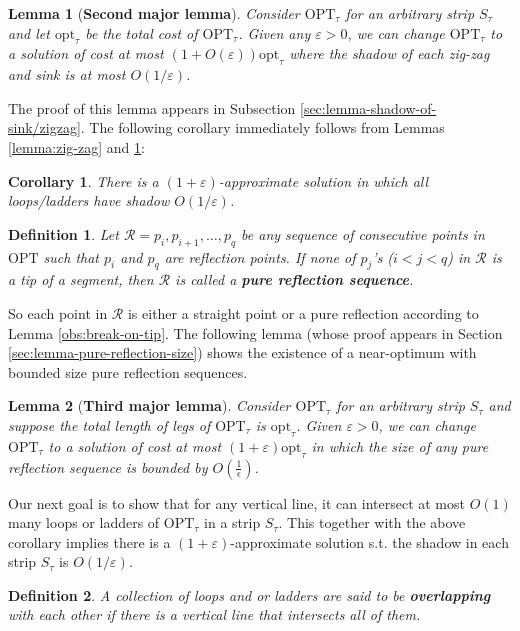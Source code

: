 \documentclass[pdflatex,sn-mathphys-num]{sn-jnl}
\theoremstyle{thmstyleone}
\newtheorem{lemma}{Lemma}
\newtheorem{corollary}{Corollary}
\newtheorem{definition}{Definition} %
\newcommand{\eps}{\varepsilon}
\newcommand{\opt}{{\text{opt}}}
\newcommand{\OPT}{{\text{OPT}}}
\begin{document}
\begin{lemma}[\bf Second major lemma]\label{lem:strip-bounded-shadow}
    Consider $\OPT_\tau$ for an arbitrary strip $S_\tau$ and
    let $\opt_\tau$ be the total cost of $\OPT_\tau$. Given any 
    $\eps>0$, we can change $\OPT_\tau$ to a solution of cost at most $(1+O(\eps))\opt_\tau$ where the shadow of each zig-zag and sink is at most $O(1/\eps)$.
\end{lemma}

The proof of this lemma appears in Subsection \ref{sec:lemma-shadow-of-sink/zigzag}. The following corollary immediately follows from Lemmas \ref{lemma:zig-zag} and \ref{lem:strip-bounded-shadow}:
\begin{corollary}\label{cor:loop-bounded-shadow}
    There is a $(1+\eps)$-approximate solution in which all loops/ladders have shadow $O(1/\eps)$.
\end{corollary}

\begin{definition}\label{def:pure-reflections}
    Let $\mathcal R = p_i, p_{i+1},\ldots, p_q$ be any sequence of consecutive points in $\OPT$ such that $p_i$ and $p_{q}$ are reflection points. If none of $p_j$'s ($i<j<q$) in $\mathcal R$ is a tip of a segment, then $\mathcal R$ is called a \textbf{pure reflection sequence}.
\end{definition}
So each point in $\mathcal R$ is either a straight point or a pure reflection according to Lemma \ref{obs:break-on-tip}. 
The following lemma (whose proof appears in Section \ref{sec:lemma-pure-reflection-size}) shows the existence of a near-optimum with bounded size pure reflection sequences.

\begin{lemma}[\bf Third major lemma]\label{lemma:reflections}
    Consider $\OPT_\tau$ for an arbitrary strip $S_\tau$ and suppose the total length of legs of $\OPT_\tau$ is $\opt_\tau$.
    Given $\eps>0$, we can change $\OPT_\tau$ to a solution of cost at most $(1+\eps)\opt_\tau$ in which 
    the size of any pure reflection sequence is bounded by  $O(\frac1\epsilon)$.
\end{lemma}

Our next goal is to show that for any vertical line, it can intersect at most $O(1)$ many loops or ladders of
$\OPT_\tau$ in a strip $S_\tau$. This together with the above corollary implies there is a $(1+\eps)$-approximate solution s.t. the shadow in each strip $S_\tau$ is $O(1/\eps)$.

\begin{definition}
    A collection of loops and or ladders are said to be \textbf{overlapping} with each other if there is a vertical line that intersects
    all of them.
\end{definition}
\end{document}
